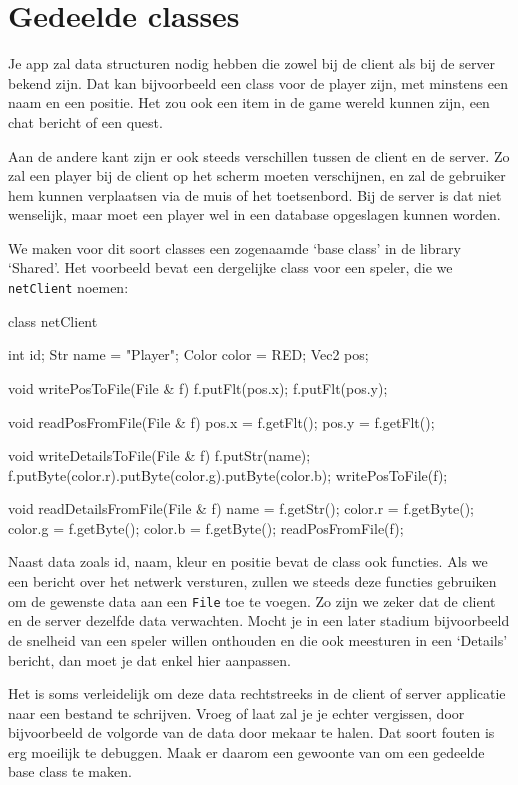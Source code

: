 \section{Gedeelde classes}
Je app zal data structuren nodig hebben die zowel bij de client als bij de server bekend zijn. Dat kan bijvoorbeeld een class voor de player zijn, met minstens een naam en een positie. Het zou ook een item in de game wereld kunnen zijn, een chat bericht of een quest. 

Aan de andere kant zijn er ook steeds verschillen tussen de client en de server. Zo zal een player bij de client op het scherm moeten verschijnen, en zal de gebruiker hem kunnen verplaatsen via de muis of het toetsenbord. Bij de server is dat niet wenselijk, maar moet een player wel in een database opgeslagen kunnen worden.

We maken voor dit soort classes een zogenaamde `base class' in de library `Shared'. Het voorbeeld bevat een dergelijke class voor een speler, die we \texttt{netClient} noemen:

\begin{code}
class netClient
{
   int id;
   Str name = "Player";
   Color color = RED;
   Vec2 pos;

   void writePosToFile(File & f)
   {
      f.putFlt(pos.x);
      f.putFlt(pos.y);
   }
   
   void readPosFromFile(File & f)
   {
      pos.x = f.getFlt();
      pos.y = f.getFlt();
   }
      
   void writeDetailsToFile(File & f)
   {
      f.putStr(name);
      f.putByte(color.r).putByte(color.g).putByte(color.b);
      writePosToFile(f);
   }
   
   void readDetailsFromFile(File & f)
   {
      name = f.getStr();
      color.r = f.getByte(); color.g = f.getByte(); color.b = f.getByte();
      readPosFromFile(f);
   }
}
\end{code}

Naast data zoals id, naam, kleur en positie bevat de class ook functies. Als we een bericht over het netwerk versturen, zullen we steeds deze functies gebruiken om de gewenste data aan een \texttt{File} toe te voegen. Zo zijn we zeker dat de client en de server dezelfde data verwachten. Mocht je in een later stadium bijvoorbeeld de snelheid van een speler willen onthouden en die ook meesturen in een `Details' bericht, dan moet je dat enkel hier aanpassen. 

\begin{note}
Het is soms verleidelijk om deze data rechtstreeks in de client of server applicatie naar een bestand te schrijven. Vroeg of laat zal je je echter vergissen, door bijvoorbeeld de volgorde van de data door mekaar te halen. Dat soort fouten is erg moeilijk te debuggen. Maak er daarom een gewoonte van om een gedeelde base class te maken. 
\end{note}
